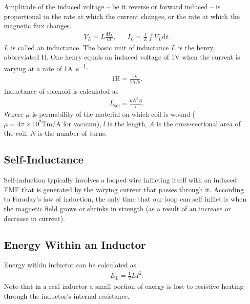 \documentclass[../../document]{subfiles}
\begin{document}
Amplitude of the induced voltage -- be it reverse or forward induced -- is
proportional to the rate at which the current changes, or the rate at which the
magnetic flux changes.
\begin{align}
	V_L = L\frac{\mathrm d I_L}{\mathrm dt}, && I_L = \frac{1}{L}\int V_L\mathrm d t.
\end{align}
\(L\) is called an inductance. The basic unit of inductance \(L\) is the henry,
abbreviated \unit{\henry}. One henry equals an induced voltage of 1\unit{\volt}
when the current is varying at a rate of 1\unit{\ampere\per\second}:
\cite{practical_electronics}
\begin{gather}
	1\unit{\henry} = \frac{1\unit{\volt}}{1\unit{\ampere/\second}}. \tag{Definition of a henry}
\end{gather}
Inductance of solenoid is calculated as 
\begin{gather}
	L_{\text{sol}} = \frac{\mu N^2A}{l}.
\end{gather}
Where \(\mu\) is permability of the material on which coil is wound (\(\mu
=4\pi\times 10^{7}\unit{\tesla\meter\per\ampere}\) for vacuum), \(l\) is the
length, \(A\) is the cross-sectional area of the coil, \(N\) is the number of
turns. \cite{practical_electronics}



\subsection{Self-Inductance}
Self-induction typically involves a looped wire inflicting itself with an
induced EMF that is generated by the varying current that passes through it.
According to Faraday’s law of induction, the only time that our loop can self
­inflict is when the magnetic field grows or shrinks in strength (as a result
of an increase or decrease in current). \cite{practical_electronics}

\subsection{Energy Within an Inductor}
Energy within inductor can be calculated as 
\begin{gather}
	E_L = \frac{1}{2}LI^2.
\end{gather}
Note that in a real inductor a small portion of energy is lost to resistive
heating through the inductor’s internal resistance.
\cite{practical_electronics}
\end{document}
